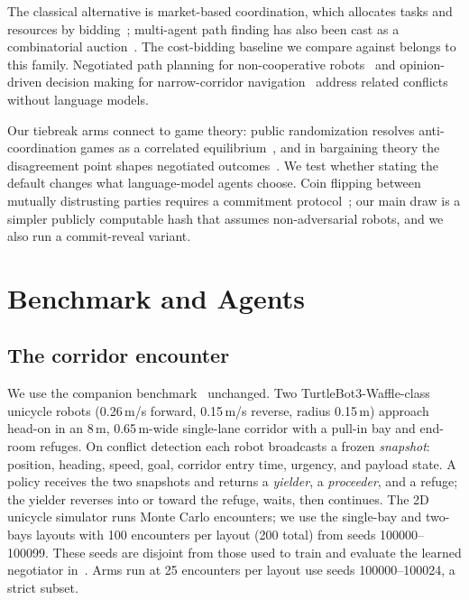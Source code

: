\documentclass[journal]{IEEEtran}
\begin{document}
The classical alternative is market-based coordination, which allocates tasks and resources by bidding~\cite{dias2006market,gerkey2002sold}; multi-agent path finding has also been cast as a combinatorial auction~\cite{amir2015mapfauction}. The cost-bidding baseline we compare against belongs to this family. Negotiated path planning for non-cooperative robots~\cite{gautier2022negotiated} and opinion-driven decision making for narrow-corridor navigation~\cite{alghamdi2025opinion} address related conflicts without language models.

Our tiebreak arms connect to game theory: public randomization resolves anti-coordination games as a correlated equilibrium~\cite{aumann1974subjectivity}, and in bargaining theory the disagreement point shapes negotiated outcomes~\cite{nash1950bargaining}. We test whether stating the default changes what language-model agents choose. Coin flipping between mutually distrusting parties requires a commitment protocol~\cite{blum1983coin}; our main draw is a simpler publicly computable hash that assumes non-adversarial robots, and we also run a commit-reveal variant.

\section{Benchmark and Agents}
\label{sec:bench}
\subsection{The corridor encounter}
We use the companion benchmark~\cite{paper1} unchanged. Two TurtleBot3-Waffle-class unicycle robots (0.26\,m/s forward, 0.15\,m/s reverse, radius 0.15\,m) approach head-on in an 8\,m, 0.65\,m-wide single-lane corridor with a pull-in bay and end-room refuges. On conflict detection each robot broadcasts a frozen \emph{snapshot}: position, heading, speed, goal, corridor entry time, urgency, and payload state. A policy receives the two snapshots and returns a \emph{yielder}, a \emph{proceeder}, and a refuge; the yielder reverses into or toward the refuge, waits, then continues. The 2D unicycle simulator runs Monte Carlo encounters; we use the single-bay and two-bays layouts with 100 encounters per layout (200 total) from seeds 100000--100099. These seeds are disjoint from those used to train and evaluate the learned negotiator in~\cite{paper1}. Arms run at 25 encounters per layout use seeds 100000--100024, a strict subset.
\end{document}
